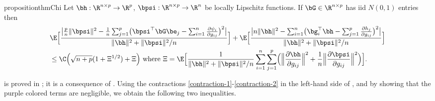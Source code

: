 \documentclass{colt2022} %
\numberwithin{equation}{section}
\begin{document}
\begin{restatable}{proposition}{thmChi}
    \label{prop:chi2-custom}
    Let $\bh:\R^{n\times p}\to\R^p$,
    $\bpsi:\R^{n\times p}\to\R^n$
    be locally Lipschitz functions.
    If $\bG\in\R^{n\times p}$ has iid $N(0,1)$ entries then
    \begin{align*}
    &\E\Bigl[
    \frac{
    \big|
    \frac p n\|\bpsi\|^2 -
    \frac 1 n
    \sum_{j=1}^p
    \bigl(
        \bpsi^\top\bG\be_j - \sum_{i=1}^n\frac{\partial \psi_i}{\partial g_{ij}}
    \bigr)^2
    \big|
    }{\|\bh\|^2 + \|\bpsi\|^2/n}
    \Bigr]
    +
    \E\Bigl[
    \frac{
    \big|
    n \|\bh\|^2 - \sum_{i=1}^n
    \bigl(
        \bg_i^\top\bh - \sum_{j=1}^p\frac{\partial h_j}{\partial g_{ij}}
    \bigr)^2
    \big|
    }{\|\bh\|^2 + \|\bpsi\|^2/n}
    \Bigr]
    \\&\le
    \C \Bigl(
        \sqrt{n+p}
        (1+\Xi^{1/2}) + \Xi
    \Bigr)
    \text{ where }\Xi = 
    \E\Bigl[
    \frac{1}{\|\bh\|^2 + \|\bpsi\|^2/n}
    \sum_{i=1}^n
    \sum_{j=1}^p
        \Bigl(
        \Big\|
        \frac{\partial \bh}{\partial g_{ij}}
        \Big\|^2
        +
        \frac1n
        \Big\|
        \frac{\partial \bpsi}{\partial g_{ij}}
        \Big\|^2
    \Big)
        \Bigr].
    \end{align*}
\end{restatable}
 is proved in ; 
it is a consequence
of \cite[Theorem 7.1]{bellec2020out_of_sample}.
Using the contractions \eqref{contraction-1}-\eqref{contraction-2}
in the left-hand side of ,
and by showing that the purple colored terms are negligible,
we obtain the following two inequalities.
\end{document}
